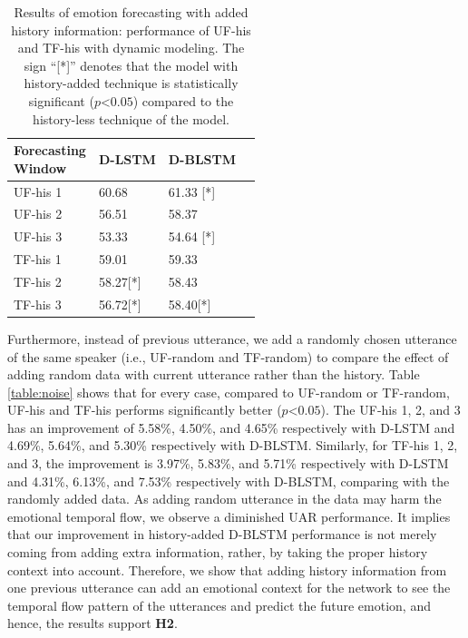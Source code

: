 \begin{table}[h]
\centering
\caption{Results of emotion forecasting with added history information: performance of UF-his and TF-his with dynamic modeling. The sign ``[*]'' denotes that the model with history-added technique is statistically significant ($p$\textless$0.05$) compared to the history-less technique of the model. }

\begin{tabular}{llll}
\hline
\makecell{\textbf{Forecasting}\\\textbf{Window}}  & \textbf{D-LSTM} & \textbf{D-BLSTM }\\
\hline
\hline
UF-his 1 & 60.68 & 61.33 [*] \\

UF-his 2 & 56.51 & 58.37 \\

UF-his 3 & 53.33 & 54.64 [*] \\

\hline

TF-his 1 & 59.01 & 59.33 \\

TF-his 2 & 58.27[*] & 58.43 \\

TF-his 3 & 56.72[*] & 58.40[*] \\

\hline
\end{tabular}
\label{table:history}
\end{table}



Furthermore, instead of previous utterance, we add a randomly chosen utterance of the same speaker (i.e., UF-random and TF-random) to compare the effect of adding random data with current utterance rather than the history.  Table \ref{table:noise} shows that for every case, compared to UF-random or TF-random, UF-his and TF-his performs significantly better ($p$\textless$0.05$). The UF-his 1, 2, and 3 has an improvement of 5.58\%, 4.50\%, and 4.65\% respectively with D-LSTM and 4.69\%, 5.64\%, and 5.30\% respectively with D-BLSTM. Similarly, for TF-his 1, 2, and 3, the improvement is 3.97\%, 5.83\%, and 5.71\% respectively with D-LSTM and 4.31\%, 6.13\%, and 7.53\% respectively with D-BLSTM, comparing with the randomly added data.  As adding random utterance in the data may harm the emotional temporal flow, we observe a diminished UAR performance. It implies that our improvement in history-added D-BLSTM performance is not merely coming from adding extra information, rather, by taking the proper history context into account. Therefore, we show that adding history information from one previous utterance can add an emotional context for the network to see the temporal flow pattern of the utterances and predict the future emotion, and hence, the results support \textbf{H2}. 

